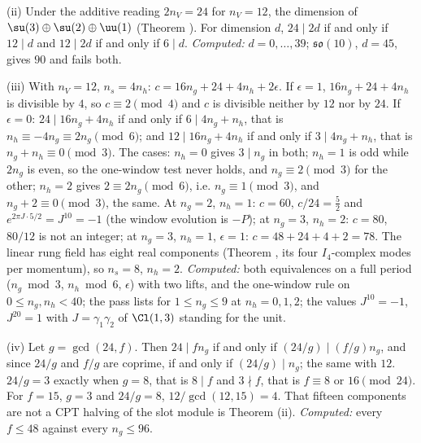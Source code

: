 (ii) Under the additive reading $2n_{V} = 24$ for $n_{V} = 12$, the dimension of $\su(3) \oplus \su(2) \oplus \uu(1)$ (Theorem ). For dimension $d$, $24 \mid 2d$ if and only if $12 \mid d$ and $12 \mid 2d$ if and only if $6 \mid d$. \emph{Computed:} $d = 0, \dots, 39$; $\mathfrak{so}(10)$, $d = 45$, gives $90$ and fails both.

(iii) With $n_{V} = 12$, $n_{s} = 4n_{h}$: $c = 16n_{g} + 24 + 4n_{h} + 2\epsilon$. If $\epsilon = 1$, $16n_{g} + 24 + 4n_{h}$ is divisible by $4$, so $c \equiv 2 \pmod 4$ and $c$ is divisible neither by $12$ nor by $24$. If $\epsilon = 0$: $24 \mid 16n_{g} + 4n_{h}$ if and only if $6 \mid 4n_{g} + n_{h}$, that is $n_{h} \equiv -4n_{g} \equiv 2n_{g} \pmod 6$; and $12 \mid 16n_{g} + 4n_{h}$ if and only if $3 \mid 4n_{g} + n_{h}$, that is $n_{g} + n_{h} \equiv 0 \pmod 3$. The cases: $n_{h} = 0$ gives $3 \mid n_{g}$ in both; $n_{h} = 1$ is odd while $2n_{g}$ is even, so the one-window test never holds, and $n_{g} \equiv 2 \pmod 3$ for the other; $n_{h} = 2$ gives $2 \equiv 2n_{g} \pmod 6$, i.e. $n_{g} \equiv 1 \pmod 3$, and $n_{g} + 2 \equiv 0 \pmod 3$, the same. At $n_{g} = 2$, $n_{h} = 1$: $c = 60$, $c/24 = \tfrac52$ and $e^{2\pi J\cdot 5/2} = J^{10} = -1$ (the window evolution is $-P$); at $n_{g} = 3$, $n_{h} = 2$: $c = 80$, $80/12$ is not an integer; at $n_{g} = 3$, $n_{h} = 1$, $\epsilon = 1$: $c = 48 + 24 + 4 + 2 = 78$. The linear rung field has eight real components (Theorem , its four $I_{4}$-complex modes per momentum), so $n_{s} = 8$, $n_{h} = 2$. \emph{Computed:} both equivalences on a full period ($n_{g} \bmod 3$, $n_{h} \bmod 6$, $\epsilon$) with two lifts, and the one-window rule on $0 \le n_{g}, n_{h} < 40$; the pass lists for $1 \le n_{g} \le 9$ at $n_{h} = 0, 1, 2$; the values $J^{10} = -1$, $J^{20} = 1$ with $J = \gamma_{1}\gamma_{2}$ of $\Cl(1,3)$ standing for the unit.

(iv) Let $g = \gcd(24, f)$. Then $24 \mid fn_{g}$ if and only if $(24/g) \mid (f/g)n_{g}$, and since $24/g$ and $f/g$ are coprime, if and only if $(24/g) \mid n_{g}$; the same with $12$. $24/g = 3$ exactly when $g = 8$, that is $8 \mid f$ and $3 \nmid f$, that is $f \equiv 8$ or $16 \pmod{24}$. For $f = 15$, $g = 3$ and $24/g = 8$, $12/\gcd(12,15) = 4$. That fifteen components are not a CPT halving of the slot module is Theorem (ii). \emph{Computed:} every $f \le 48$ against every $n_{g} \le 96$.

